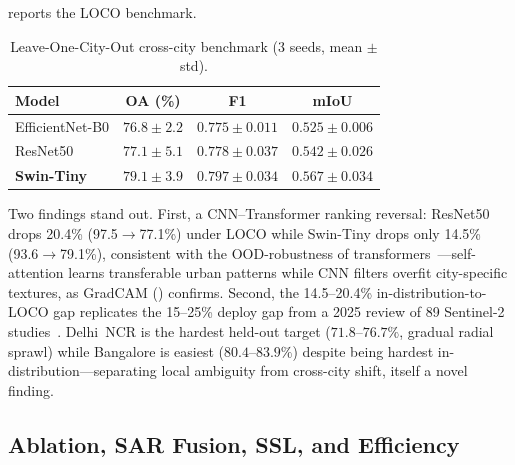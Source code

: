 \documentclass[conference]{IEEEtran}
\begin{document}
 reports the LOCO benchmark.

\begin{table}[t]
\centering
\caption{Leave-One-City-Out cross-city benchmark (3 seeds, mean $\pm$ std).}
\label{tab:loco}
\footnotesize
\begin{tabular}{lccc}
\toprule
Model & OA (\%) & F1 & mIoU\\
\midrule
EfficientNet-B0 & $76.8 \pm 2.2$ & $0.775 \pm 0.011$ & $0.525 \pm 0.006$\\
ResNet50        & $77.1 \pm 5.1$ & $0.778 \pm 0.037$ & $0.542 \pm 0.026$\\
\textbf{Swin-Tiny}& $\mathbf{79.1 \pm 3.9}$ & $\mathbf{0.797 \pm 0.034}$ & $\mathbf{0.567 \pm 0.034}$\\
\bottomrule
\end{tabular}
\end{table}

Two findings stand out. First, a CNN--Transformer ranking reversal: ResNet50 drops 20.4\% (97.5$\to$77.1\%) under LOCO while Swin-Tiny drops only 14.5\% (93.6$\to$79.1\%), consistent with the OOD-robustness of transformers~\cite{bai2021}---self-attention learns transferable urban patterns while CNN filters overfit city-specific textures, as GradCAM () confirms. Second, the 14.5--20.4\% in-distribution-to-LOCO gap replicates the 15--25\% deploy gap from a 2025 review of 89 Sentinel-2 studies~\cite{mdpi2025}. Delhi~NCR is the hardest held-out target ($71.8$--$76.7\%$, gradual radial sprawl) while Bangalore is easiest ($80.4$--$83.9\%$) despite being hardest in-distribution---separating local ambiguity from cross-city shift, itself a novel finding.

\subsection{Ablation, SAR Fusion, SSL, and Efficiency}
\end{document}
